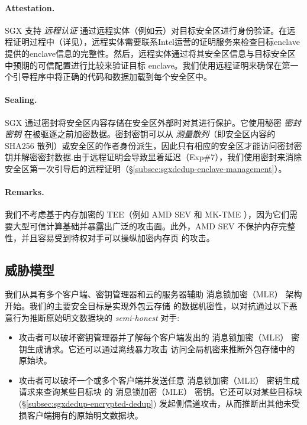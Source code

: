 \paragraph*{Attestation.} SGX 支持 \textit{ 远程认证} 通过远程实体（例如云）对目标安全区进行身份验证。在远程证明过程中（详见\cite{sgx}），远程实体需要联系Intel运营的证明服务来检查目标enclave提供的enclave信息的完整性。然后，远程实体通过将其安全区信息与目标安全区中预期的可信配置进行比较来验证目标 enclave。我们使用远程证明来确保在第一个引导程序中将正确的代码和数据加载到每个安全区中。

\paragraph*{Sealing.} SGX 通过密封将安全区内容存储在安全区外部时对其进行保护。它使用秘密 \textit{ 密封密钥} 在被驱逐之前加密数据。密封密钥可以从 \textit{ 测量散列}（即安全区内容的 SHA256 散列）或安全区的作者身份派生，因此只有相应的安全区才能访问密封密钥并解密密封数据.由于远程证明会导致显着延迟（Exp\#7），我们使用密封来消除安全区第一次引导后的远程证明（\S\ref{subsec:sgxdedup-enclave-management}）。

\paragraph*{Remarks.} 我们不考虑基于内存加密的 TEE（例如 AMD SEV \cite{Amdsev} 和 MK-TME \cite{Mktem}），因为它们需要大型可信计算基础并暴露出广泛的攻击面\cite{mofrad18}。此外，AMD SEV \cite{Amdsev} 不保护内存完整性，并且容易受到特权对手可以操纵加密内存页 \cite{mofrad18} 的攻击。

\subsection{威胁模型}
\label{subsec:sgxdedup-threat}

 我们从具有多个客户端、密钥管理器和云的服务器辅助 消息锁加密（MLE） 架构 \cite{bellare13b} 开始。我们的主要安全目标是实现外包云存储 \cite{bellare13b} 的数据机密性，以对抗通过以下恶意行为推断原始明文数据块的 \textit{ semi-honest} 对手:

\begin{itemize}[leftmargin=*]
\item 攻击者可以破坏密钥管理器并了解每个客户端发出的 消息锁加密（MLE） 密钥生成请求。它还可以通过离线暴力攻击 \cite{bellare13b} 访问全局机密来推断外包存储中的原始块。
    \item 攻击者可以破坏一个或多个客户端并发送任意 消息锁加密（MLE） 密钥生成请求来查询某些目标块 \cite{bellare13b} 的 消息锁加密（MLE） 密钥。它还可以对某些目标块 \cite{harnik10} (\S\ref{subsec:sgxdedup-encrypted-dedup}) 发起侧信道攻击，从而推断出其他未受损客户端拥有的原始明文数据块。
\end{itemize}

